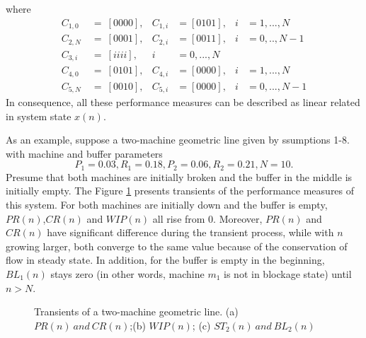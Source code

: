 where
\begin{equation}
    \begin{aligned}
        C_{1,0}\ &= \ [0 0 0 0],  &C_{1,i}&= [0 1 0 1],  &i&= 1,...,N \\
        C_{2,N}\ &=\ [0 0 0 1],  &C_{2,i}&= [0 0 1 1],  &i&= 0,..,N-1 \\
        C_{3,i}\ &=\ [i i i i],  &i&=  0,...,N \\
        C_{4,0}\ &=\ [0 1 0 1],  &C_{4,i}&= [0 0 0 0],  &i&= 1,...,N  \\
        C_{5,N}\ &=\ [0 0 1 0],  &C_{5,i}&= [0 0 0 0],  &i&= 0,...,N-1
    \end{aligned}
\end{equation}
In consequence, all these performance measures can be described as linear related in system state $x(n)$.

As an example, suppose a two-machine geometric line given by ssumptions 1-8. with machine and buffer parameters
\begin{displaymath}
	P_1=0.03, R_1=0.18, P_2=0.06, R_2=0.21, N=10.
\end{displaymath}
Presume that both machines are initially broken and the buffer in the middle is initially empty. The Figure \ref{Transients of a two-machine geometric line} presents transients of the performance measures of this system. For both machines are initially down and the buffer is empty, $PR(n)$,$ CR(n)$ and $WIP(n)$ all rise from $0$. Moreover, $PR(n)$ and $CR(n)$ have significant difference during the transient process, while with $n$ growing larger, both converge to the same value because of the conservation of flow in steady state. In addition, for the buffer is empty in the beginning, $BL_1(n)$ stays zero (in other words, machine $m_1$ is not in blockage state) until $n > N$.

\begin{figure*}[!h]
	\centering
	\caption{Transients of a two-machine geometric line. (a) $PR(n)\ and\ CR(n)$;(b) $WIP(n)$; (c) $ST_2(n)\ and\ BL_2(n)$}
	\label{Transients of a two-machine geometric line}
\end{figure*}


